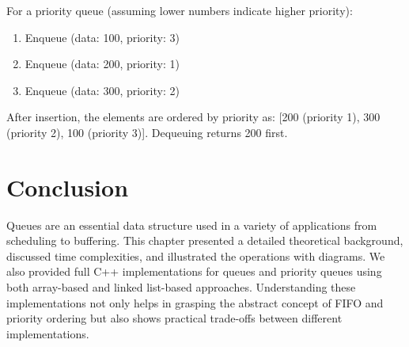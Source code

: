 For a priority queue (assuming lower numbers indicate higher priority):
\begin{enumerate}
    \item Enqueue (data: 100, priority: 3)
    \item Enqueue (data: 200, priority: 1)
    \item Enqueue (data: 300, priority: 2)  
\end{enumerate}
After insertion, the elements are ordered by priority as: [200 (priority 1), 300 (priority 2), 100 (priority 3)]. Dequeuing returns 200 first.

\section{Conclusion}
Queues are an essential data structure used in a variety of applications from scheduling to buffering. This chapter presented a detailed theoretical background, discussed time complexities, and illustrated the operations with diagrams. We also provided full C++ implementations for queues and priority queues using both array-based and linked list-based approaches. Understanding these implementations not only helps in grasping the abstract concept of FIFO and priority ordering but also shows practical trade-offs between different implementations.